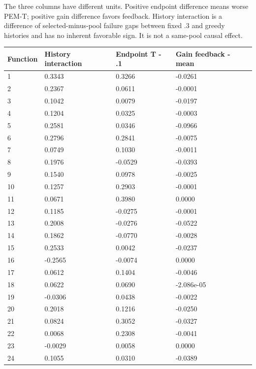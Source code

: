\documentclass[11pt,a4paper]{article}
\begin{document}
The three columns have different units. Positive endpoint difference
means worse PEM-T; positive gain difference favors feedback. History
interaction is a difference of selected-minus-pool failure gaps between
fixed .3 and greedy histories and has no inherent favorable sign. It is
not a same-pool causal effect.

\par\noindent\begin{minipage}{\linewidth}

\begin{longtable}[]{@{}llll@{}}
\toprule
Function & History interaction & Endpoint T - .1 & Gain feedback -
mean \\
\midrule
\endhead
1 & 0.3343 & 0.3266 & -0.0261 \\
2 & 0.2367 & 0.0611 & -0.0001 \\
3 & 0.1042 & 0.0079 & -0.0197 \\
4 & 0.1204 & 0.0325 & -0.0003 \\
5 & 0.2581 & 0.0346 & -0.0966 \\
6 & 0.2796 & 0.2841 & -0.0075 \\
7 & 0.0749 & 0.1030 & -0.0011 \\
8 & 0.1976 & -0.0529 & -0.0393 \\
9 & 0.1540 & 0.0978 & -0.0025 \\
10 & 0.1257 & 0.2903 & -0.0001 \\
11 & 0.0671 & 0.3980 & 0.0000 \\
12 & 0.1185 & -0.0275 & -0.0001 \\
13 & 0.2008 & -0.0276 & -0.0522 \\
14 & 0.1862 & -0.0770 & -0.0028 \\
15 & 0.2533 & 0.0042 & -0.0237 \\
16 & -0.2565 & -0.0074 & 0.0000 \\
17 & 0.0612 & 0.1404 & -0.0046 \\
18 & 0.0622 & 0.0690 & -2.086e-05 \\
19 & -0.0306 & 0.0438 & -0.0022 \\
20 & 0.2018 & 0.1216 & -0.0250 \\
21 & 0.0824 & 0.3052 & -0.0327 \\
22 & 0.0068 & 0.2308 & -0.0041 \\
23 & -0.0029 & 0.0058 & 0.0000 \\
24 & 0.1055 & 0.0310 & -0.0389 \\
\bottomrule
\end{longtable}

\end{minipage}\par
\end{document}
